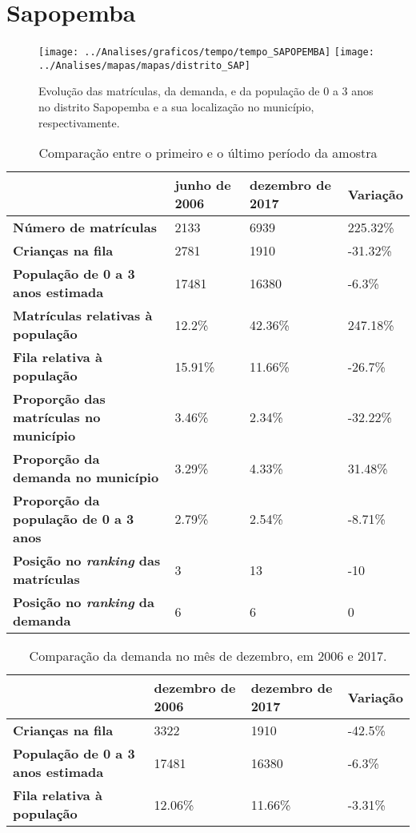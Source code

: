 \section{Sapopemba}
\begin{figure}[H]
\centering
\texttt{[image: ../Analises/graficos/tempo/tempo\_SAPOPEMBA]}
\texttt{[image: ../Analises/mapas/mapas/distrito\_SAP]}
\caption{Evolução das matrículas, da demanda, e da população de 0 a 3 anos no distrito Sapopemba e a sua localização no município, respectivamente.}
\end{figure}
\begin{table}[H]
\begin{tabular}{l|l|l|l}
\textbf{}                                      & \textbf{junho de 2006}       & \textbf{dezembro de 2017}    & \textbf{Variação} \\ \hline
\textbf{Número de matrículas}                  & 2133 & 6939 & 225.32\% \\ \hline
\textbf{Crianças na fila}                      & 2781 & 1910 & -31.32\% \\ \hline
\textbf{População de 0 a 3 anos estimada}      & 17481 & 16380 & -6.3\% \\ \hline
\textbf{Matrículas relativas à população}      & 12.2\% & 42.36\% & 247.18\% \\ \hline
\textbf{Fila relativa à população}             & 15.91\% & 11.66\% & -26.7\% \\ \hline
\textbf{Proporção das matrículas no município} & 3.46\% & 2.34\% & -32.22\% \\ \hline
\textbf{Proporção da demanda no município}     & 3.29\% & 4.33\% & 31.48\% \\ \hline
\textbf{Proporção da população de 0 a 3 anos}  & 2.79\% & 2.54\% & -8.71\% \\ \hline
\textbf{Posição no \textit{ranking} das matrículas}     & 3 & 13 & -10 \\ \hline
\textbf{Posição no \textit{ranking} da demanda}         & 6 & 6 & 0 \\ 
\end{tabular}
\caption{Comparação entre o primeiro e o último período da amostra}
\end{table}
\begin{table}[H]
\begin{tabular}{l|l|l|l}
\textbf{}                                 & \textbf{dezembro de 2006} & \textbf{dezembro de 2017} & \textbf{Variação} \\ \hline
\textbf{Crianças na fila}                      & 3322 & 1910 & -42.5\% \\ \hline
\textbf{População de 0 a 3 anos estimada}      & 17481 & 16380 & -6.3\% \\ \hline
\textbf{Fila relativa à população}             & 12.06\% & 11.66\% & -3.31\% \\
\end{tabular}
\caption{Comparação da demanda no mês de dezembro, em 2006 e 2017.}
\end{table}
